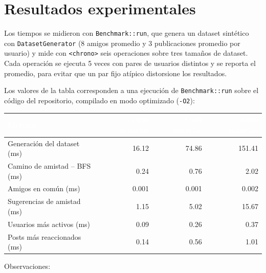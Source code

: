 \documentclass[11pt,a4paper]{article}
\begin{document}
\newpage
\section{Resultados experimentales}
\label{sec:resultados}

Los tiempos se midieron con \texttt{Benchmark::run}, que genera un
dataset sintético con \texttt{DatasetGenerator} (8 amigos promedio y 3
publicaciones promedio por usuario) y mide con \texttt{<chrono>} seis
operaciones sobre tres tamaños de dataset. Cada operación se
ejecuta 5 veces con pares de usuarios distintos y se reporta el promedio,
para evitar que un par fijo atípico distorsione los resultados.

Los valores de la tabla corresponden a una ejecución de
\texttt{Benchmark::run} sobre el código del repositorio, compilado en
modo optimizado (\texttt{-O2}):

\begin{center}
\begin{tabular}{@{}l r r r@{}}
\toprule
\rowcolor{tablehead}
\textcolor{white}{\textbf{Métrica}} &
\textcolor{white}{\textbf{1\,000 usuarios}} &
\textcolor{white}{\textbf{5\,000 usuarios}} &
\textcolor{white}{\textbf{10\,000 usuarios}} \\
\midrule
Generación del dataset (ms)   & 16.12 & 74.86 & 151.41 \\
Camino de amistad -- BFS (ms) & 0.24  & 0.76  & 2.02 \\
Amigos en común (ms)          & 0.001 & 0.001 & 0.002 \\
Sugerencias de amistad (ms)   & 1.15  & 5.02  & 15.67 \\
Usuarios más activos (ms)     & 0.09  & 0.26  & 0.37 \\
Posts más reaccionados (ms)   & 0.14  & 0.56  & 1.01 \\
\bottomrule
\end{tabular}
\end{center}

Observaciones:
\end{document}
